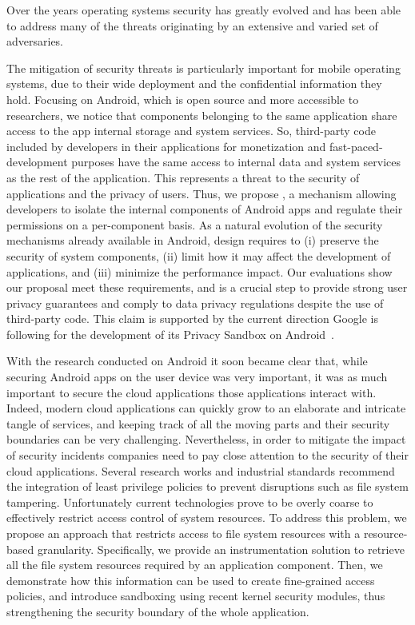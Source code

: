 Over the years operating systems security has greatly evolved and has
been able to address many of the threats originating by an extensive
and varied set of adversaries.

The mitigation of security threats is particularly important for
mobile operating systems, due to their wide deployment and the
confidential information they hold. Focusing on Android, which is open
source and more accessible to researchers, we notice that components
belonging to the same application share access to the app internal
storage and system services. So, third-party code included by
developers in their applications for monetization and
fast-paced-development purposes have the same access to internal data
and system services as the rest of the application. This represents a
threat to the security of applications and the privacy of users. Thus,
we propose \seapp, a mechanism allowing developers to isolate the
internal components of Android apps and regulate their permissions on
a per-component basis. As a natural evolution of the security
mechanisms already available in Android, \seapp design requires to
(i) preserve the security of system components, (ii) limit how it
may affect the development of applications, and (iii) minimize the
performance impact. Our evaluations show our proposal meet these
requirements, and \seapp is a crucial step to provide strong user
privacy guarantees and comply to data privacy regulations despite the
use of third-party code. This claim is supported by the current
direction Google is following for the development of its Privacy
Sandbox on Android~\cite{android-privacy-sandbox}.

With the research conducted on Android it soon became clear that,
while securing Android apps on the user device was very important,
it was as much important to secure the cloud applications those
applications interact with. Indeed, modern cloud applications can
quickly grow to an elaborate and intricate tangle of services, and
keeping track of all the moving parts and their security boundaries
can be very challenging. Nevertheless, in order to mitigate the
impact of security incidents companies need to pay close attention
to the security of their cloud applications. Several research works
and industrial standards recommend the integration of least
privilege policies to prevent disruptions such as file system
tampering. Unfortunately current technologies prove to be overly
coarse to effectively restrict access control of system resources.
To address this problem, we propose an approach that restricts access
to file system resources with a resource-based granularity.
Specifically, we provide an instrumentation solution to retrieve all
the file system resources required by an application component. Then,
we demonstrate how this information can be used to create fine-grained
access policies, and introduce sandboxing using recent kernel security
modules, thus strengthening the security boundary of the whole
application.


